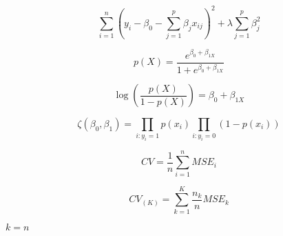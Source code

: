 \documentclass[10pt]{book}
\begin{document}
\begin{mdSnippets}
\begin{mdDisplaySnippet}%
\[%
\sum_{i=1}^{n}(y_i-\beta_0-\sum_{j=1}^{p}\beta_j x_{ij})^2+\lambda \sum_{j=1}^{p}\beta_j^2
\]%
\end{mdDisplaySnippet}%
\begin{mdDisplaySnippet}[fa844e2e7d8c97568d2d0301d5147257]%
\[%
p(X)=\frac{e^{\beta_0+\beta_{1X}}}{1+e^{\beta_0+\beta_{1X}}}
\]%
\end{mdDisplaySnippet}%
\begin{mdDisplaySnippet}%
\[%
\log(\frac{p(X)}{1-p(X)}) = \beta_0+\beta_{1X}
\]%
\end{mdDisplaySnippet}%
\begin{mdDisplaySnippet}[3434640df0abf3c9138498896d5d4bb3]%
\[%
  \zeta(\beta_0,\beta_1)= \prod_{i:y_i=1}p(x_i)\prod_{i:y_i=0}(1-p(x_i))
\]%
\end{mdDisplaySnippet}%
\begin{mdDisplaySnippet}%
\[%
  CV=\frac{1}{n}\sum_{i=1}^{n}MSE_i
\]%
\end{mdDisplaySnippet}%
\begin{mdDisplaySnippet}[9ad5431ed4f79d040b8d2e68eb912e33]%
\[%
CV_{(K)}=\sum_{k=1}^{K}\frac{n_k}{n}MSE_k
\]%
\end{mdDisplaySnippet}%
\begin{mdInlineSnippet}[0a4b018f4a1382228c85c71a987d566f]%
$k=n$\end{mdInlineSnippet}%

\end{mdSnippets}
\end{document}
